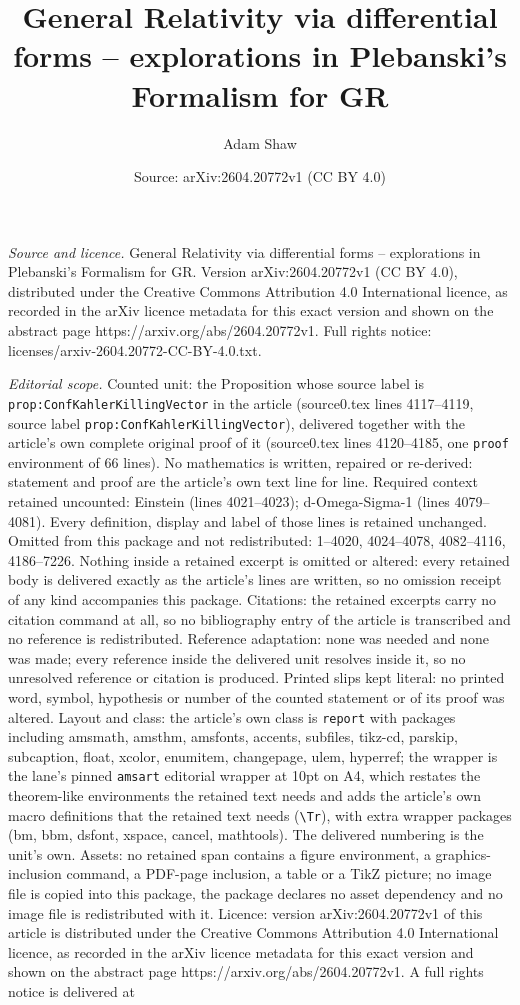 \documentclass[10pt,a4paper]{amsart}
\title[General Relativity via differential forms -- explorations in]{General Relativity via differential forms -- explorations in Plebanski's Formalism for GR}
\author{Adam Shaw}
\date{Source: arXiv:2604.20772v1 (CC BY 4.0)}
\begin{document}
\maketitle

\noindent\emph{Source and licence.} General Relativity via differential forms -- explorations in Plebanski's Formalism for GR. Version arXiv:2604.20772v1 (CC BY 4.0), distributed under the Creative Commons Attribution 4.0 International licence, as recorded in the arXiv licence metadata for this exact version and shown on the abstract page https://arxiv.org/abs/2604.20772v1. Full rights notice: licenses/arxiv-2604.20772-CC-BY-4.0.txt.\par\smallskip

\noindent\textit{Editorial scope.} Counted unit: the Proposition whose source label is \texttt{prop:ConfKahlerKillingVector} in the article (source0.tex lines 4117--4119, source label \texttt{prop:ConfKahlerKillingVector}), delivered together with the article's own complete original proof of it (source0.tex lines 4120--4185, one \texttt{proof} environment of 66 lines). No mathematics is written, repaired or re-derived: statement and proof are the article's own text line for line. Required context retained uncounted: Einstein (lines 4021--4023); d-Omega-Sigma-1 (lines 4079--4081). Every definition, display and label of those lines is retained unchanged. Omitted from this package and not redistributed: 1--4020, 4024--4078, 4082--4116, 4186--7226. Nothing inside a retained excerpt is omitted or altered: every retained body is delivered exactly as the article's lines are written, so no omission receipt of any kind accompanies this package. Citations: the retained excerpts carry no citation command at all, so no bibliography entry of the article is transcribed and no reference is redistributed. Reference adaptation: none was needed and none was made; every reference inside the delivered unit resolves inside it, so no unresolved reference or citation is produced. Printed slips kept literal: no printed word, symbol, hypothesis or number of the counted statement or of its proof was altered. Layout and class: the article's own class is \texttt{report} with packages including amsmath, amsthm, amsfonts, accents, subfiles, tikz-cd, parskip, subcaption, float, xcolor, enumitem, changepage, ulem, hyperref; the wrapper is the lane's pinned \texttt{amsart} editorial wrapper at 10pt on A4, which restates the theorem-like environments the retained text needs and adds the article's own macro definitions that the retained text needs (\texttt{\textbackslash Tr}), with extra wrapper packages (bm, bbm, dsfont, xspace, cancel, mathtools). The delivered numbering is the unit's own. Assets: no retained span contains a figure environment, a graphics-inclusion command, a PDF-page inclusion, a table or a TikZ picture; no image file is copied into this package, the package declares no asset dependency and no image file is redistributed with it. Licence: version arXiv:2604.20772v1 of this article is distributed under the Creative Commons Attribution 4.0 International licence, as recorded in the arXiv licence metadata for this exact version and shown on the abstract page https://arxiv.org/abs/2604.20772v1. A full rights notice is delivered at 
\end{document}
